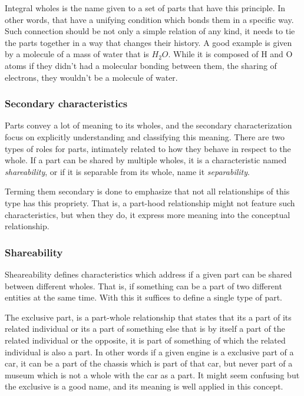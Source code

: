 Integral wholes is the name given to a set of parts that have this principle. In other words, that have a unifying condition which bonds them in a specific way. Such connection should be not only a simple relation of any kind, it needs to tie the parts together in a way that changes their history. A good example is given by a molecule of a mass of water that is $H_2O$. While it is composed of H and O atoms if they didn't had a molecular bonding between them, the sharing of electrons, they wouldn't be a molecule of water.

\subsubsection{Secondary characteristics}

Parts convey a lot of meaning to its wholes, and the secondary characterization focus on explicitly understanding and classifying this meaning. There are two types of roles for parts, intimately related to how they behave in respect to the whole. If a part can be shared by multiple wholes, it is a characteristic named \textit{shareability}, or if it is separable from its whole, name it \textit{separability}.

Terming them secondary is done to emphasize that not all relationships of this type has this propriety. That is, a part-hood relationship might not feature such characteristics, but when they do, it express more meaning into the conceptual relationship.

\subsubsection{Shareability}

Sheareability defines characteristics which address if a given part can be shared between different wholes. That is, if something can be a part of two different entities at the same time. With this it suffices to define a single type of part. 

The exclusive part, is a part-whole relationship that states that its a part of its related individual or its a part of something else that is by itself a part of the related individual or the opposite, it is part of something of which the related individual is also a part. In other words if a given engine is a exclusive part of a car, it can be a part of the chassis which is part of that car, but never part of a museum which is not a whole with the car as a part. It might seem confusing but the exclusive is a good name, and its meaning is well applied in this concept.

